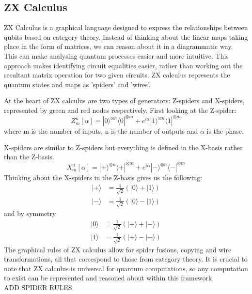 \documentclass[12pt]{article}
\newcommand{\newp}
    {
    \vskip 0.5cm 
  }
\numberwithin{equation}{section}
\begin{document}
\subsection{ZX Calculus}
ZX Calculus is a graphical language designed to express the relationships between 
qubits based on category theory. Instead of thinking about the linear maps taking place
in the form of matrices, we can reason about it in a diagrammatic way. This 
can make analysing quantum processes easier and more intuitive. This approach 
makes identifying circuit equalities easier, rather than working out the resultant 
matrix operation for two given circuits. ZX calculus represents the quantum states 
and maps as 'spiders' and 'wires'. 
\newp 
At the heart of ZX calculus are two types of generators: Z-spiders and X-spiders,
represented by green and red nodes respectively. First looking at the Z-spider: 
\begin{equation}
  Z^n_m[\alpha] = |0\rangle^{\otimes n}\langle0|^{\otimes m}+e^{i\alpha}
  |1\rangle^{\otimes n}\langle1|^{\otimes m}
\end{equation}
where m is the number of inputs, n is the number of outputs and $\alpha$ is the 
phase.
\newp
X-spiders are similar to Z-spiders but everything is defined in the X-basis rather 
than the Z-basis. 
\begin{equation}
  X^n_m[\alpha] = |+\rangle^{\otimes n}\langle +|^{\otimes m}+e^{i\alpha}| -\rangle 
  ^{\otimes n}\langle - | ^{\otimes m}
\end{equation}
Thinking about the X-spiders in the Z-basis gives us the following: 
\begin{equation}
  \begin{split}
    |+\rangle &= \frac{1}{\sqrt2}(|0\rangle+|1\rangle)\\
    |-\rangle &= \frac{1}{\sqrt2}(|0\rangle-|1\rangle)
  \end{split}
\end{equation}
and by symmetry
\begin{equation}
  \begin{split}
    |0\rangle &= \frac{1}{\sqrt2}(|+\rangle+|-\rangle)\\
    |1\rangle &= \frac{1}{\sqrt2}(|+\rangle-|-\rangle)
  \end{split}
\end{equation}
The graphical rules of ZX calculus allow for spider fusions, copying and wire 
transformations, all that correspond to those from category theory. It is crucial 
to note that ZX calculus is universal for quantum computations, so any computation 
to exist can be represented and reasoned about within this framework. 
\\
ADD SPIDER RULES
\end{document}
